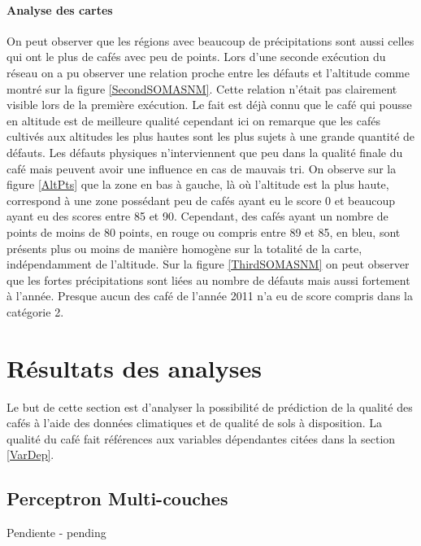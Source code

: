 \paragraph{Analyse des cartes}On peut observer que les régions avec beaucoup de précipitations sont aussi celles qui ont le plus de cafés avec peu de points. Lors d'une seconde exécution du réseau on a pu observer une relation proche entre les défauts et l'altitude comme montré sur la figure \ref{SecondSOMASNM}. Cette relation n'était pas clairement visible lors de la première exécution. Le fait est déjà connu que le café qui pousse en altitude est de meilleure qualité cependant ici on remarque que les cafés cultivés aux altitudes les plus hautes sont les plus sujets à une grande quantité de défauts. Les défauts physiques n'interviennent que peu dans la qualité finale du café mais peuvent avoir une influence en cas de mauvais tri. On observe sur la figure \ref{AltPts} que la zone en bas à gauche, là où l'altitude est la plus haute, correspond à une zone possédant peu de cafés ayant eu le score 0 et beaucoup ayant eu des scores entre 85 et 90. Cependant, des cafés ayant un nombre de points de moins de 80 points, en rouge ou compris entre 89 et 85, en bleu, sont présents plus ou moins de manière homogène sur la totalité de la carte, indépendamment de l'altitude. Sur la figure \ref{ThirdSOMASNM} on peut observer que les fortes précipitations sont liées au nombre de défauts mais aussi fortement à l'année. Presque aucun des café de l'année 2011 n'a eu de score compris dans la catégorie 2. 











\newpage

\section{Résultats des analyses  }
Le but de cette section est d'analyser la possibilité de prédiction de la qualité des cafés à l'aide des données climatiques et de qualité de sols à disposition. La qualité du café fait références aux variables dépendantes citées dans la section \ref{VarDep}.

\subsection{Perceptron Multi-couches}
Pendiente - pending


